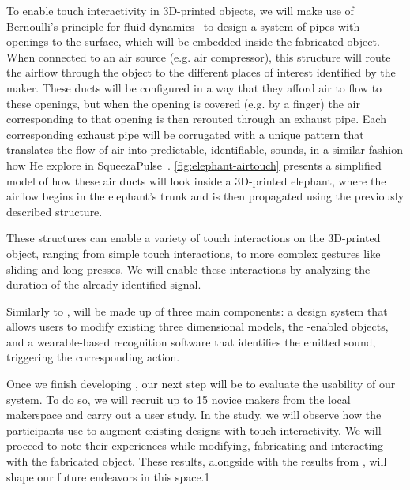         To enable touch interactivity in 3D-printed objects, we will make use
        of Bernoulli's principle for fluid dynamics~\cite{Bernoulli:1738ut} to
        design a system of pipes with openings to the surface, which will be
        embedded inside the fabricated object. When connected to an air source
        (e.g. air compressor), this structure will route the airflow through
        the object to the different places of interest identified by the maker.
        These ducts will be configured in a way that they afford air to flow to
        these openings, but when the opening is covered (e.g. by a finger) the
        air corresponding to that opening is then rerouted through an exhaust
        pipe. Each corresponding exhaust pipe will be corrugated with a unique
        pattern that translates the flow of air into predictable, identifiable,
        sounds, in a similar fashion how He \etal explore in
        SqueezaPulse~\cite{He:2017jc}. \cref{fig:elephant-airtouch} presents a
        simplified model of how these air ducts will look inside a 3D-printed
        elephant, where the airflow begins in the elephant's trunk and is then
        propagated using the previously described structure.
        
        These structures can enable a variety of touch interactions on the
        3D-printed object, ranging from simple touch interactions, to more
        complex gestures like sliding and long-presses. We will enable these
        interactions by analyzing the duration of the already
        identified signal.
                
        Similarly to \bh, \at will be made up of three main components: a
        design system that allows users to modify existing three dimensional
        models, the \at-enabled objects, and a wearable-based recognition
        software that identifies the emitted sound, triggering the
        corresponding action.
        
        Once we finish developing \at, our next step will be to evaluate the
        usability of our system. To do so, we will recruit up to 15 novice
        makers from the local makerspace and carry out a user study. In the
        study, we will observe how the participants use \at to augment existing
        designs with touch interactivity. We will proceed to note their
        experiences while modifying, fabricating and interacting with the
        fabricated object. These results, alongside with the results from \bh,
        will shape our future endeavors in this space.1
        
